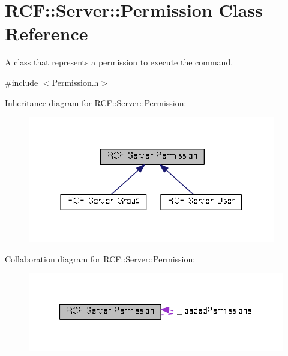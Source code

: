 \hypertarget{class_r_c_f_1_1_server_1_1_permission}{}\section{R\+C\+F\+:\+:Server\+:\+:Permission Class Reference}
\label{class_r_c_f_1_1_server_1_1_permission}


A class that represents a permission to execute the command.  




{\ttfamily \#include $<$Permission.\+h$>$}



Inheritance diagram for R\+C\+F\+:\+:Server\+:\+:Permission\+:\nopagebreak
\begin{figure}[H]
\begin{center}
\leavevmode
\includegraphics[width=306pt]{class_r_c_f_1_1_server_1_1_permission__inherit__graph}
\end{center}
\end{figure}


Collaboration diagram for R\+C\+F\+:\+:Server\+:\+:Permission\+:\nopagebreak
\begin{figure}[H]
\begin{center}
\leavevmode
\includegraphics[width=327pt]{class_r_c_f_1_1_server_1_1_permission__coll__graph}
\end{center}
\end{figure}
